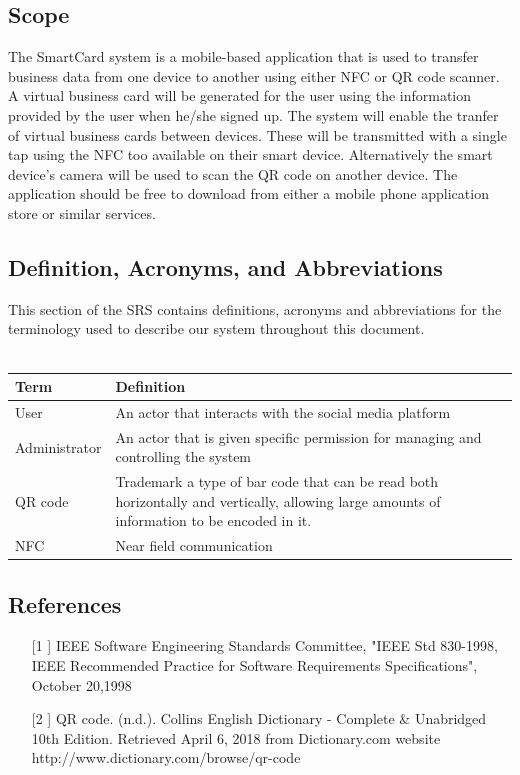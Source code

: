 \documentclass[english]{article}
\begin{document}
		\subsection{Scope}
The SmartCard system is a mobile-based application that is used to transfer business data from one device to another using either NFC or QR code scanner. A virtual business card will be generated for the user using the information provided by the user when he/she signed up. The system will enable the tranfer of virtual business cards between devices. These will be transmitted with a single tap using the NFC too available on their smart device. Alternatively the smart device’s camera will be used to scan the QR code on another device. The application should be free to download from either a mobile phone application store or similar services. 


		\subsection{Definition, Acronyms, and Abbreviations}
				This section of the SRS contains definitions, acronyms and abbreviations for the terminology used to describe our system throughout this document.
				\\
				\\
				\begin{tabular}{ |p{3cm}|p{9cm}|  }
				\hline
				\textbf{Term} & \textbf{Definition}\\
				\hline
				User & An actor that interacts with the social media platform\\
				\hline
				Administrator & An actor that is given specific permission for managing and controlling the system\\
				\hline
				QR code & Trademark a type of bar code that can be read both horizontally and vertically, allowing large amounts of information to be encoded in it.\\
				\hline
				NFC & Near field communication \\
				\hline
				\end{tabular}


		\subsection{References}
\begin{itemize}
			\item [[1]] IEEE Software Engineering Standards Committee, "IEEE Std 830-1998, IEEE Recommended Practice for Software Requirements Specifications", October 20,1998 \\
			\item [[2]] QR code. (n.d.). Collins English Dictionary - Complete \& Unabridged 10th Edition. Retrieved April 6, 2018 from Dictionary.com website http://www.dictionary.com/browse/qr-code
		
		\end{itemize}
\end{document}
